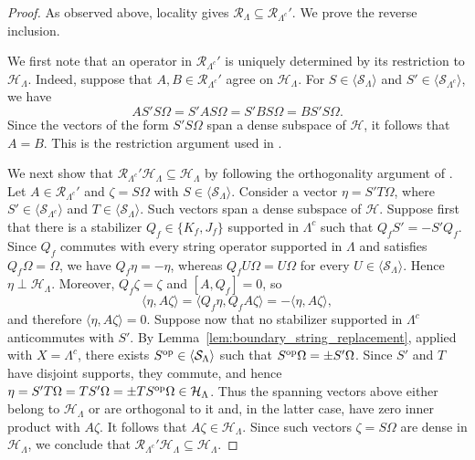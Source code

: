 \documentclass[a4paper,11pt]{article}
\theoremstyle{definition}
\theoremstyle{remark}
\theoremstyle{remark}
\begin{document}
\begin{proof}
As observed above, locality gives $\mathcal R_\Lambda\subseteq\mathcal R_{\Lambda^c}'$. We prove the reverse inclusion.

We first note that an operator in $\mathcal R_{\Lambda^c}'$ is uniquely determined by its restriction to $\mathcal H_\Lambda$. Indeed, suppose that $A,B\in\mathcal R_{\Lambda^c}'$ agree on $\mathcal H_\Lambda$. For $S\in\langle\mathcal S_\Lambda\rangle$ and $S'\in\langle\mathcal S_{\Lambda^c}\rangle$, we have
\[
    AS'S\Omega=S'AS\Omega=S'BS\Omega=BS'S\Omega.
\]
Since the vectors of the form $S'S\Omega$ span a dense subspace of $\mathcal H$, it follows that $A=B$. This is the restriction argument used in \cite[Lemma~3.5]{naaijkens2012haag}.

We next show that $\mathcal R_{\Lambda^c}'\mathcal H_\Lambda\subseteq\mathcal H_\Lambda$ by following the orthogonality argument of \cite[Lemma~3.6]{naaijkens2012haag}. Let $A\in\mathcal R_{\Lambda^c}'$ and $\zeta=S\Omega$ with $S\in\langle\mathcal S_\Lambda\rangle$. Consider a vector $\eta=S'T\Omega$, where $S'\in\langle\mathcal S_{\Lambda^c}\rangle$ and $T\in\langle\mathcal S_\Lambda\rangle$. Such vectors span a dense subspace of $\mathcal H$. Suppose first that there is a stabilizer $Q_f\in\{K_f,J_f\}$ supported in $\Lambda^c$ such that $Q_fS'=-S'Q_f$. Since $Q_f$ commutes with every string operator supported in $\Lambda$ and satisfies $Q_f\Omega=\Omega$, we have $Q_f\eta=-\eta$, whereas $Q_fU\Omega=U\Omega$ for every $U\in\langle\mathcal S_\Lambda\rangle$. Hence $\eta\perp\mathcal H_\Lambda$. Moreover, $Q_f\zeta=\zeta$ and $[A,Q_f]=0$, so
\[
    \langle\eta,A\zeta\rangle=\langle Q_f\eta,Q_fA\zeta\rangle=-\langle\eta,A\zeta\rangle,
\]
and therefore $\langle\eta,A\zeta\rangle=0$. Suppose now that no stabilizer supported in $\Lambda^c$ anticommutes with $S'$. By Lemma~\ref{lem:boundary_string_replacement}, applied with $X=\Lambda^c$, there exists $S^{\rm op}\in\langle\mathcal S_\Lambda\rangle$ such that $S^{\rm op}\Omega=\pm S'\Omega$. Since $S'$ and $T$ have disjoint supports, they commute, and hence $\eta=S'T\Omega=TS'\Omega=\pm TS^{\rm op}\Omega\in\mathcal H_\Lambda$. Thus the spanning vectors above either belong to $\mathcal H_\Lambda$ or are orthogonal to it and, in the latter case, have zero inner product with $A\zeta$. It follows that $A\zeta\in\mathcal H_\Lambda$. Since such vectors $\zeta=S\Omega$ are dense in $\mathcal H_\Lambda$, we conclude that $\mathcal R_{\Lambda^c}'\mathcal H_\Lambda\subseteq\mathcal H_\Lambda$.


\end{proof}
\end{document}
